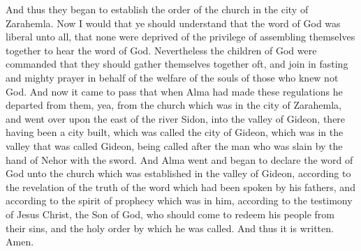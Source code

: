 \bverse \iffalse And thus they began to establish the order of the church in the city of Zarahemla. \fi
And thus they began to establish the order of the church in the city of Zarahemla.
\bverse \iffalse Now I would that ye should understand that the word of God was liberal unto all, that none were deprived of the privilege of assembling themselves together to hear the word of God. \fi
Now I would that ye should understand that the word of God was liberal unto all, that none were deprived of the privilege of assembling themselves together to hear the word of God.
\bverse \iffalse Nevertheless the children of God were commanded that they should gather themselves together oft, and join in fasting and mighty prayer in behalf of the welfare of the souls of those who knew not God. \fi
Nevertheless the children of God were commanded that they should gather themselves together oft, and join in fasting and mighty prayer in behalf of the welfare of the souls of those who knew not God.
\bverse \iffalse And now it came to pass that when Alma had made these regulations he departed from them, yea, from the church which was in the city of Zarahemla, and went over upon the east of the river Sidon, into the valley of Gideon, there having been a city built, which was called the city of Gideon, which was in the valley that was called Gideon, being called after the man who was slain by the hand of Nehor with the sword. \fi
And now it came to pass that when Alma had made these regulations he departed from them, yea, from the church which was in the city of Zarahemla, and went over upon the east of the river Sidon, into the valley of Gideon, there having been a city built, which was called the city of Gideon, which was in the valley that was called Gideon, being called after the man who was slain by the hand of Nehor with the sword.
\bverse \iffalse And Alma went and began to declare the word of God unto the church which was established in the valley of Gideon, according to the revelation of the truth of the word which had been spoken by his fathers, and according to the spirit of prophecy which was in him, according to the testimony of Jesus Christ, the Son of God, who should come to redeem his people from their sins, and the holy order by which he was called. And thus it is written.  Amen. \fi
And Alma went and began to declare the word of God unto the church which was established in the valley of Gideon, according to the revelation of the truth of the word which had been spoken by his fathers, and according to the spirit of prophecy which was in him, according to the testimony of Jesus Christ, the Son of God, who should come to redeem his people from their sins, and the holy order by which he was called. And thus it is written.  Amen.
